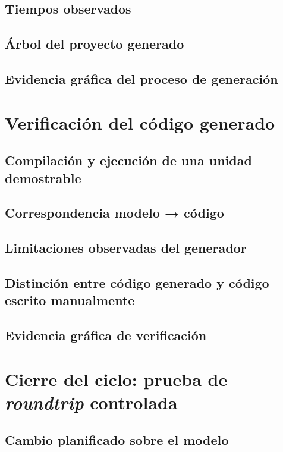 \documentclass[11pt,a4paper]{article}
\begin{document}
\subsection{Tiempos observados}

\subsection{Árbol del proyecto generado}

\subsection{Evidencia gráfica del proceso de generación}

\section{Verificación del código generado}

\subsection{Compilación y ejecución de una unidad demostrable}

\subsection{Correspondencia modelo → código}

\subsection{Limitaciones observadas del generador}

\subsection{Distinción entre código generado y código escrito manualmente}

\subsection{Evidencia gráfica de verificación}

\section{Cierre del ciclo: prueba de \textit{roundtrip} controlada}

\subsection{Cambio planificado sobre el modelo}
\end{document}
